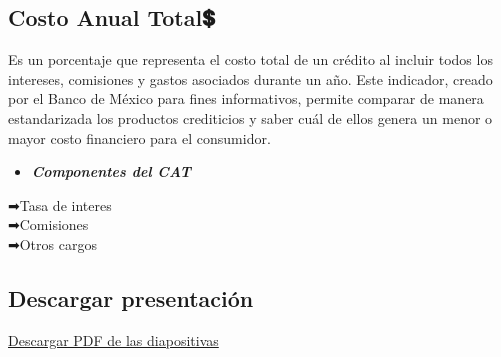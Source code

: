 \documentclass[
  letterpaper,
  DIV=11,
  numbers=noendperiod]{scrartcl}
\providecommand{\tightlist}{%
  \setlength{\itemsep}{0pt}\setlength{\parskip}{0pt}}
\begin{document}
\subsection{Costo Anual Total💲}\label{costo-anual-total}

Es un porcentaje que representa el costo total de un crédito al incluir
todos los intereses, comisiones y gastos asociados durante un año. Este
indicador, creado por el Banco de México para fines informativos,
permite comparar de manera estandarizada los productos crediticios y
saber cuál de ellos genera un menor o mayor costo financiero para el
consumidor.

\begin{itemize}
\tightlist
\item
  \textbf{\emph{Componentes del CAT}}
\end{itemize}

➡Tasa de interes\\
➡Comisiones\\
➡Otros cargos

\subsection{Descargar presentación}\label{descargar-presentaciuxf3n}

\href{equipo2.pdf}{Descargar PDF de las diapositivas}
\end{document}
